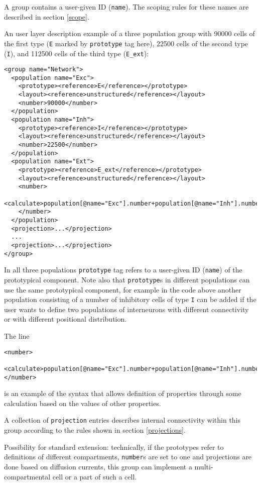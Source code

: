 \documentclass{article}
\begin{document}
A group contains a user-given ID ({\tt name}). The scoping rules for these names
are described in section \ref{scope}.

An user layer description example of a three population group with 90000 cells of
the first type ({\tt E} marked by {\tt prototype} tag here), 22500 cells of the second
type ({\tt I}), and 112500 cells of the third type ({\tt E\_ext}):
\begin{verbatim}
<group name="Network">
  <population name="Exc">
    <prototype><reference>E</reference></prototype>
    <layout><reference>unstructured</reference></layout>
    <number>90000</number>
  </population>
  <population name="Inh">
    <prototype><reference>I</reference></prototype>
    <layout><reference>unstructured</reference></layout>
    <number>22500</number>
  </population>
  <population name="Ext">
    <prototype><reference>E_ext</reference></prototype>
    <layout><reference>unstructured</reference></layout>
    <number>
      <calculate>population[@name="Exc"].number+population[@name="Inh"].number</calculate>
    </number>
  </population>
  <projection>...</projection>
  ...
  <projection>...</projection>
</group>
\end{verbatim}
In all three populations {\tt prototype} tag refers to a user-given ID ({\tt name})
of the prototypical component. Note also that {\tt prototype}s in different populations
can use the same prototypical component, for example in the code above another population
consisting of a number of inhibitory cells of type {\tt I} can be added if the user
wants to define two populations of interneurons with different connectivity or
with different positional distribution.

The line
\begin{verbatim}
<number>
  <calculate>population[@name="Exc"].number+population[@name="Inh"].number</calculate>
</number>
\end{verbatim}
is an example of the syntax that allows definition of properties through
some calculation based on the values of other properties.

A collection of {\tt projection} entries describes internal connectivity within
this group according to the rules shown in section \ref{projections}.

Possibility for standard extension: technically, if the prototypes refer to
definitions of different compartments, {\tt number}s are set to one and projections
are done based on diffusion currents, this group can implement a multi-compartmental
cell or a part of such a cell.
\end{document}
